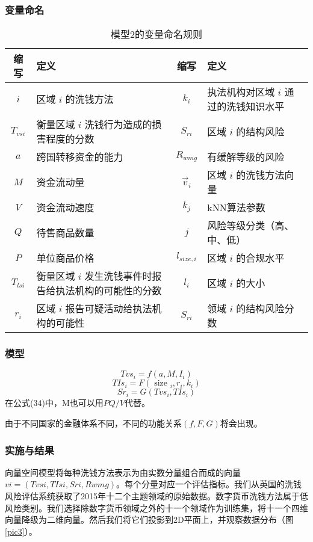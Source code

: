 \documentclass[withoutpreface,bwprint]{cumcmthesis} %
\begin{document}
\subsubsection{变量命名}
\begin{table}[h]
	\centering
	\caption{模型2的变量命名规则}
	\label{tab6}
	\begin{tabular}{clcl}
		\toprule[1.5pt]
		缩写 & 定义 & 缩写 & 定义 \\ \midrule[1pt]
		\(i\) & 区域 \(i\) 的洗钱方法 & \(k_i\) & 执法机构对区域 \(i\) 通过的洗钱知识水平 \\
		\(T_{vsi}\) & 衡量区域 \(i\) 洗钱行为造成的损害程度的分数 & \(S_{ri}\) & 区域 \(i\) 的结构风险 \\
		\(a\) & 跨国转移资金的能力 & \(R_{wmg}\) & 有缓解等级的风险 \\
		\(M\) & 资金流动量 & \(\vec{v}_i\) & 区域 \(i\) 的洗钱方法向量 \\
		\(V\) & 资金流动速度 & \(k_j\) & kNN算法参数 \\
		\(Q\) & 待售商品数量 & \(j\) & 风险等级分类（高、中、低） \\
		\(P\) & 单位商品价格 & \(l_{size,i}\) & 区域 \(i\) 的合规水平 \\
		\(T_{lsi}\) & 衡量区域 \(i\) 发生洗钱事件时报告给执法机构的可能性的分数 & \(l_i\) & 区域 \(i\) 的大小 \\
		\(r_i\) & 区域 \(i\) 报告可疑活动给执法机构的可能性 & \(S_{ri}\) & 领域 \(i\) 的结构风险分数 \\ \bottomrule[1.5pt]
	\end{tabular}
\end{table}

\subsubsection{模型}
\begin{equation}
	T v s_i=f\left(a, M, I_i\right)
\end{equation}
\begin{equation}
	T I s_i=F\left(\text { size }_i, r_i, k_i\right)
\end{equation}
\begin{equation}
	S r_i=G\left(T v s_i, T I s_i\right)
\end{equation}
在公式(34)中，M也可以用${PQ}/V$代替。

由于不同国家的金融体系不同，不同的功能关系$(f,F,G)$将会出现。

\subsubsection{实施与结果}
向量空间模型将每种洗钱方法表示为由实数分量组合而成的向量$ vi = (Tvsi , TIsi , Sri , Rwmg)$。每个分量对应一个评估指标。我们从英国的洗钱风险评估系统获取了2015年十二个主题领域的原始数据。数字货币洗钱方法属于低风险类别。我们选择除数字货币领域之外的十一个领域作为训练集，将十一个四维向量降级为二维向量。然后我们将它们投影到2D平面上，并观察数据分布（图\ref{pic3}）。
\end{document}
